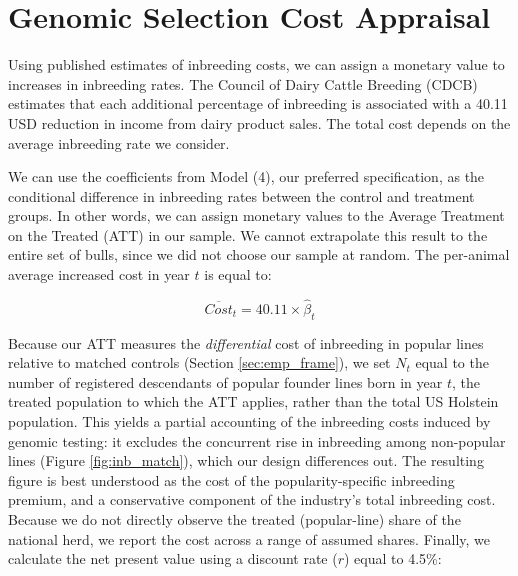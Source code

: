 \documentclass[12pt,letterpaper]{article}
\begin{document}
\newpage

\clearpage

\appendix

\section{Genomic Selection Cost Appraisal\label{sec:cost}}
Using published estimates of inbreeding costs, we can assign a monetary value to increases in inbreeding rates. The Council of Dairy Cattle Breeding (CDCB) estimates that each additional percentage of inbreeding is associated with a 40.11 USD reduction in income from dairy product sales. The total cost depends on the average inbreeding rate we consider.
 
We can use the coefficients from Model (4), our preferred specification, as the conditional difference in inbreeding rates between the control and treatment groups. In other words, we can assign monetary values to the Average Treatment on the Treated (ATT) in our sample. We cannot extrapolate this result to the entire set of bulls, since we did not choose our sample at random. The per-animal average increased cost in year $t$ is equal to:

\begin{equation}
    \overline{Cost}_{t} = 40.11\times\hat{\beta}_{t}
\end{equation}

Because our ATT measures the \emph{differential} cost of inbreeding in popular lines relative to matched controls (Section \ref{sec:emp_frame}), we set $N_{t}$ equal to the number of registered descendants of popular founder lines born in year $t$, the treated population to which the ATT applies, rather than the total US Holstein population. This yields a partial accounting of the inbreeding costs induced by genomic testing: it excludes the concurrent rise in inbreeding among non-popular lines (Figure \ref{fig:inb_match}), which our design differences out. The resulting figure is best understood as the cost of the popularity-specific inbreeding premium, and a conservative component of the industry's total inbreeding cost. Because we do not directly observe the treated (popular-line) share of the national herd, we report the cost across a range of assumed shares. Finally, we calculate the net present value using a discount rate ($r$) equal to 4.5\%:
\end{document}
